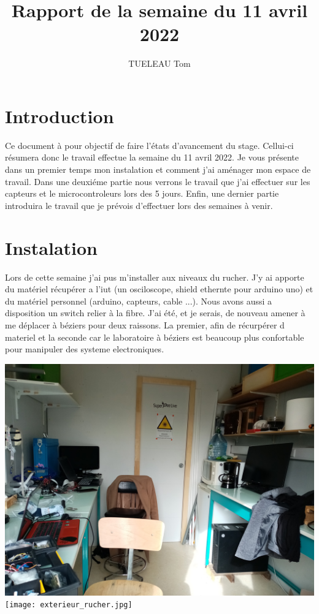 \documentclass[5pt]{article}
\title{Rapport de la semaine du 11 avril 2022}
\author{TUELEAU Tom}
\begin{document}
\maketitle
\section{Introduction}
Ce document à pour objectif de faire l'états d'avancement du stage. Cellui-ci résumera donc le travail effectue la semaine du 11 avril 2022.
Je vous présente dans un premier temps mon instalation et comment j'ai aménager mon espace de travail. Dans une deuxiéme partie
nous verrons le travail que j'ai effectuer sur les capteurs et le microcontroleurs lors des 5 jours. Enfin, une dernier partie introduira le travail 
que je prévois d'effectuer lors des semaines à venir. 

\section{Instalation}
Lors de cette semaine j'ai pus m'installer aux niveaux du rucher. J'y ai apporte du matériel récupérer a l'iut (un osciloscope, shield ethernte pour
arduino uno) et du matériel personnel (arduino, capteurs, cable ...). Nous avons aussi a disposition un switch relier à la fibre. J'ai été, et je serais,
de nouveau amener à me déplacer à béziers pour deux raissons. La premier, afin de récurpérer d materiel et la seconde car le laboratoire à béziers est beaucoup
plus confortable pour manipuler des systeme electroniques.

\begin{center}	
\includegraphics[scale=0.08]{interieur_rucher.jpg}
\label{image1}
\texttt{[image: exterieur\_rucher.jpg]}
\label{image2}
\end{center}
\end{document}
